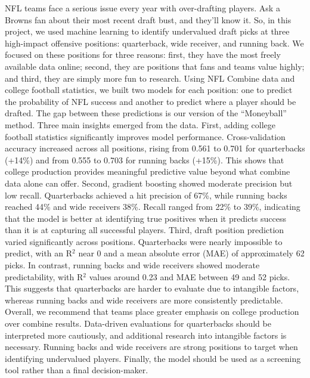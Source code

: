 \documentclass[11pt]{article}
\begin{document}
NFL teams face a serious issue every year with over-drafting players. Ask a Browns fan about their most recent draft bust, and they'll know it. So, in this project, we used machine learning to identify undervalued draft picks at three high-impact offensive positions: quarterback, wide receiver, and running back. We focused on these positions for three reasons: first, they have the most freely available data online; second, they are positions that fans and teams value highly; and third, they are simply more fun to research. Using NFL Combine data and college football statistics, we built two models for each position: one to predict the probability of NFL success and another to predict where a player should be drafted. The gap between these predictions is our version of the ``Moneyball'' method. Three main insights emerged from the data. First, adding college football statistics significantly improves model performance. Cross-validation accuracy increased across all positions, rising from 0.561 to 0.701 for quarterbacks (+14\%) and from 0.555 to 0.703 for running backs (+15\%). This shows that college production provides meaningful predictive value beyond what combine data alone can offer. Second, gradient boosting showed moderate precision but low recall. Quarterbacks achieved a hit precision of 67\%, while running backs reached 44\% and wide receivers 38\%. Recall ranged from 22\% to 39\%, indicating that the model is better at identifying true positives when it predicts success than it is at capturing all successful players. Third, draft position prediction varied significantly across positions. Quarterbacks were nearly impossible to predict, with an R$^2$ near 0 and a mean absolute error (MAE) of approximately 62 picks. In contrast, running backs and wide receivers showed moderate predictability, with R$^2$ values around 0.23 and MAE between 49 and 52 picks. This suggests that quarterbacks are harder to evaluate due to intangible factors, whereas running backs and wide receivers are more consistently predictable. Overall, we recommend that teams place greater emphasis on college production over combine results. Data-driven evaluations for quarterbacks should be interpreted more cautiously, and additional research into intangible factors is necessary. Running backs and wide receivers are strong positions to target when identifying undervalued players. Finally, the model should be used as a screening tool rather than a final decision-maker.

\end{document}
